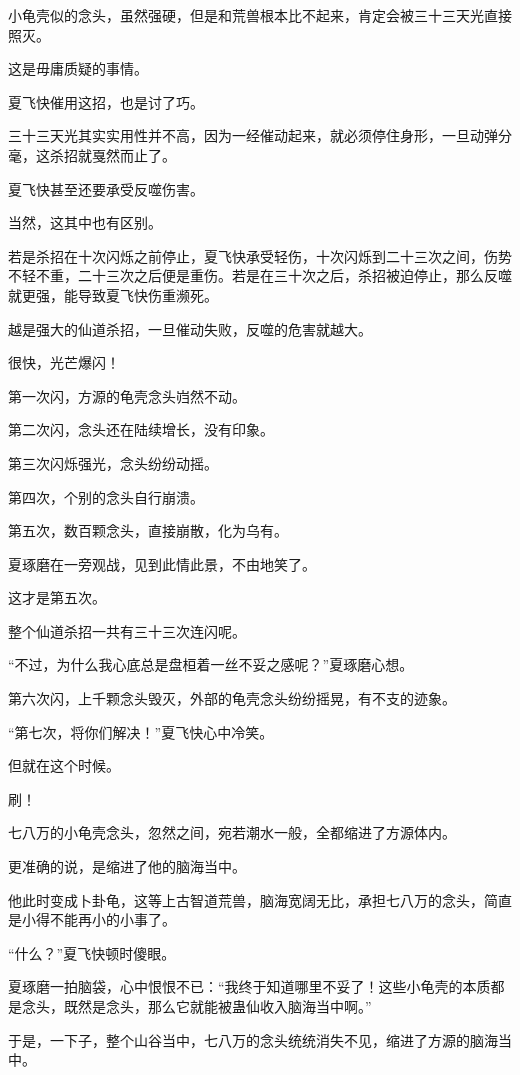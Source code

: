 \begin{this_body}
小龟壳似的念头，虽然强硬，但是和荒兽根本比不起来，肯定会被三十三天光直接照灭。

这是毋庸质疑的事情。

夏飞快催用这招，也是讨了巧。

三十三天光其实实用性并不高，因为一经催动起来，就必须停住身形，一旦动弹分毫，这杀招就戛然而止了。

夏飞快甚至还要承受反噬伤害。

当然，这其中也有区别。

若是杀招在十次闪烁之前停止，夏飞快承受轻伤，十次闪烁到二十三次之间，伤势不轻不重，二十三次之后便是重伤。若是在三十次之后，杀招被迫停止，那么反噬就更强，能导致夏飞快伤重濒死。

越是强大的仙道杀招，一旦催动失败，反噬的危害就越大。

很快，光芒爆闪！

第一次闪，方源的龟壳念头岿然不动。

第二次闪，念头还在陆续增长，没有印象。

第三次闪烁强光，念头纷纷动摇。

第四次，个别的念头自行崩溃。

第五次，数百颗念头，直接崩散，化为乌有。

夏琢磨在一旁观战，见到此情此景，不由地笑了。

这才是第五次。

整个仙道杀招一共有三十三次连闪呢。

“不过，为什么我心底总是盘桓着一丝不妥之感呢？”夏琢磨心想。

第六次闪，上千颗念头毁灭，外部的龟壳念头纷纷摇晃，有不支的迹象。

“第七次，将你们解决！”夏飞快心中冷笑。

但就在这个时候。

刷！

七八万的小龟壳念头，忽然之间，宛若潮水一般，全都缩进了方源体内。

更准确的说，是缩进了他的脑海当中。

他此时变成卜卦龟，这等上古智道荒兽，脑海宽阔无比，承担七八万的念头，简直是小得不能再小的小事了。

“什么？”夏飞快顿时傻眼。

夏琢磨一拍脑袋，心中恨恨不已：“我终于知道哪里不妥了！这些小龟壳的本质都是念头，既然是念头，那么它就能被蛊仙收入脑海当中啊。”

于是，一下子，整个山谷当中，七八万的念头统统消失不见，缩进了方源的脑海当中。


\end{this_body}
